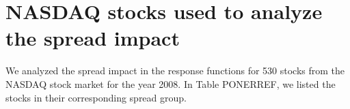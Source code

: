 \section{NASDAQ stocks used to analyze the spread impact}
\label{app:spread_impact}

We analyzed the spread impact in the response functions for 530 stocks from the
NASDAQ stock market for the year 2008. In Table PONERREF, we listed the stocks
in their corresponding spread group.
